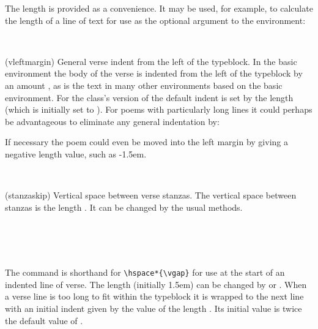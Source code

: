The length \lnc{\versewidth} is provided as a convenience. It may be used,
for example, to calculate the length of a line of text for use
as the optional argument to the  environment: 
\begin{lcode}
\settowidth{\versewidth}{This is the average line,}
\begin{verse}[\versewidth]
\end{lcode}

\begin{syntax}
\lnc{\vleftmargin} \\
\end{syntax}
\glossary(vleftmargin)%
  {}%
  {General verse indent from the left of the typeblock.}
In the basic \ltx\  environment the body of the verse is indented
from the left of the typeblock by an amount \lnc{\leftmargini}, as is the
text in many other environments based on the basic \ltx\ 
environment. For the class's version of  the default indent
is set by the length \lnc{\vleftmargin} (which is initially set to
). For poems with particularly long 
lines it could perhaps be
advantageous to eliminate any general indentation by:
\begin{lcode}
\setlength{\vleftmargin}{0em}
\end{lcode}
If necessary the poem could even be moved into the left margin by giving
\lnc{\vleftmargin} a negative length value, such as -1.5em.

\begin{syntax}
\lnc{\stanzaskip} \\
\end{syntax}
\glossary(stanzaskip)%
  {}%
  {Vertical space between verse stanzas.}
    The vertical space between stanzas is the 
length \lnc{\stanzaskip}. It can be changed by the usual methods.

\begin{syntax}
\cmd{\vin} \\
\lnc{\vgap} \\
\lnc{\vindent} \\
\end{syntax}
The command \cmd{\vin} is shorthand for \verb?\hspace*{\vgap}? for use
at the start of an indented line of verse. 
The length \lnc{\vgap}
(initially 1.5em) can be changed by \cmd{\setlength} or \cmd{\addtolength}.
When a verse line is too long to fit within the 
typeblock it is wrapped 
to the next line with an initial indent given by the value of the length
. Its initial value is twice the default value of \lnc{\vgap}.

